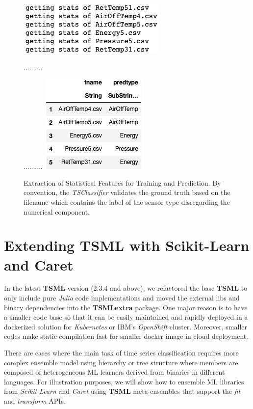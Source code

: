 \documentclass{juliacon}
\begin{document}
\begin{figure}[htbp]
   \centering
   \includegraphics[width=0.5\columnwidth]{tscl1.png} %
   
   ..........
   
   ..........
   \vskip 2pt
   \includegraphics[width=0.4\columnwidth]{tscl2.png} %
   \caption{Extraction of Statistical Features for Training and Prediction. By convention, the \emph{TSClassifier} validates the ground truth based on the filename which contains the label of the sensor type disregarding the numerical component.}
   \label{fig:tcl}
\end{figure}

\section{Extending TSML with Scikit-Learn and Caret}
In the latest \textbf{TSML} version (2.3.4 and above), 
we refactored the base \textbf{TSML}
to only include pure \emph{Julia} code implementations and moved the external libs and binary dependencies into the \textbf{TSMLextra} package. 
One major reason is to have a smaller code base so that it can be easily
maintained and rapidly deployed in a dockerized solution for \emph{Kubernetes} or IBM's \emph{OpenShift} cluster. Moreover, smaller codes make
static compilation fast for smaller docker image  
in cloud deployment. 

\vskip 6pt

There are cases where the main task of time series classification 
requires more complex ensemble model using hierarchy or tree structure where 
members are composed of heterogeneous ML learners derived from binaries in 
different languages. For illustration purposes, we will show how to 
ensemble ML libraries from \emph{Scikit-Learn} and \emph{Caret} using \textbf{TSML} meta-ensembles that support the  \emph{fit} and \emph{transform} APIs.
\end{document}
